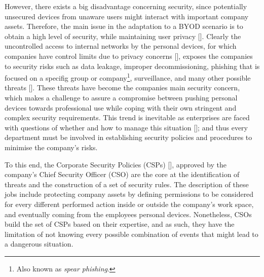 However, there exists a big disadvantage concerning security, since
potentially unsecured devices from unaware users might interact with
important company assets. Therefore, the main issue in the adaptation to a BYOD scenario is to obtain a high level
of security, while maintaining user privacy [\cite{miller2012byod}].
Clearly the uncontrolled access to internal networks by the
personal devices, for which companies have control limits
due to privacy concerns [\cite{miller2012byod}], exposes the companies to security risks such as data
leakage, improper decommissioning, phishing that is focused on a
specifig group or company\footnote{Also known as \textit{spear
    phishing}.}, 
surveillance, and many
other possible threats [\cite{lennon2012changing}]. These threats have become the
companies main security concern, which makes a challenge to
assure a compromise between pushing personal devices towards
professional use while coping with their own stringent and complex
security requirements. This trend is inevitable as enterprises are
faced with questions of whether and how to manage this situation [\cite{thomson2012byod}]; and
thus every department must be involved in establishing security
policies and procedures to minimise the company's risks.

To this end, the Corporate Security Policies (CSPs) [\cite{Kaeo:2003:DNS:1201807}], 
approved by the company's Chief Security Officer (CSO) are the core at
the  identification of threats and the construction of a set of security rules. The description of these jobs include protecting
company assets by defining permissions to be considered for every
different performed action inside or outside the company's work
space, and eventually coming from the employees personal
devices. Nonetheless, CSOs build the set of CSPs based on their
expertise, and as such, they have the limitation of not knowing every
possible combination of events that might lead to a dangerous
situation. 

